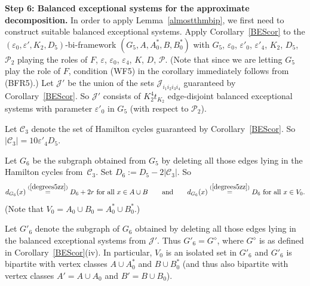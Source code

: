\documentclass{memo-l}
\def\COMMENT#1{}
\def\cC{\mathcal{C}}
\def\cP{\mathcal{P}}
\def\eps{\varepsilon}
\def\cJ{\mathcal{J}}
\def\epszero{\eps_0}
\numberwithin{section}{chapter}
\numberwithin{equation}{section}
\numberwithin{firstthm}{section}
\numberwithin{figure}{section}
\begin{document}
{\smallskip

\noindent\textbf{Step 6: Balanced exceptional systems for the approximate decomposition.}
In order to apply Lemma~\ref{almostthmbip}, we first need to construct suitable balanced exceptional systems.
Apply Corollary~\ref{BEScor} to the $(\eps_0,\eps',K_2,D_5)$-bi-framework $(G_5,A,A_0^*,B,B_0^*)$ with
 $G_5$, $\eps_0$, $\eps'_0$, $\eps'_4$, $K_2$, $D_5$, $\cP_2$ playing the roles
of $F$, $\eps$, $\eps_0$, $\eps_4$, $K$, $D$, $\cP$. 
(Note that since we are letting $G_5$ play the role of $F$, condition (WF5) in the corollary immediately follows from (BFR5).)
Let $\cJ'$ be the union of the sets $\cJ_{i_1i_2i_3i_4}$ guaranteed by Corollary~\ref{BEScor}.
So $\cJ'$ consists of $K_2^4t_{K_2}$ edge-disjoint balanced exceptional systems with parameter $\eps'_0$ in $G_5$
(with respect to $\cP_2$).%
   \COMMENT{Daniela added brackets}
Let $\cC_3$ denote the set of Hamilton cycles guaranteed by Corollary~\ref{BEScor}. So $|\cC_3|=10\eps'_4D_5$.%
   \COMMENT{Daniela added new sentence}

Let $G_6$ be the subgraph obtained from $G_5$ by deleting all those edges lying in the Hamilton cycles from~$\cC_3$.
Set $D_6:=D_5-2|\cC_3|$.
So
\begin{equation} \label{degrees6}
d_{G_6}(x)\stackrel{(\ref{degrees5zz})}{=}D_6+2r \mbox{ for all } x \in A \cup B \qquad \mbox{and} \qquad d_{G_6}(x)\stackrel{(\ref{degrees5zz})}{=}D_6 \mbox{ for all } x \in V_0.
\end{equation}
(Note that $V_0=A_0 \cup B_0=A_0^* \cup B_0^*.$)%
\COMMENT{osthus added bracket}
Let $G'_6$ denote the subgraph of $G_6$ obtained by deleting all those
edges lying in the balanced exceptional systems from $\cJ'$. Thus $G'_6=G^\diamond$, where $G^\diamond$ is as defined in Corollary~\ref{BEScor}(iv).
In particular, $V_0$ is an isolated set in $G'_6$ and $G'_6$ is bipartite with vertex classes $A\cup A^*_0$ and $B\cup B^*_0$
(and thus also bipartite with vertex classes $A'=A\cup A_0$ and $B'=B\cup B_0$).%
    \COMMENT{Daniela deleted the following paragraph (as well as the next one saying that $G'_6[A,B]$ is still part of a bi-scheme): 
"Moreover, recall that (as remarked after the corresponding definition in Section~\ref{besconstruct}), a balanced exceptional
system does not contain any $AB$-edges and thus the same holds for $\bigcup \cJ'$ too.
Thus $G'_6$ can be obtained from $G_6$ by keeping all $AB$-edges and deleting all other edges."}


}
\end{document}
